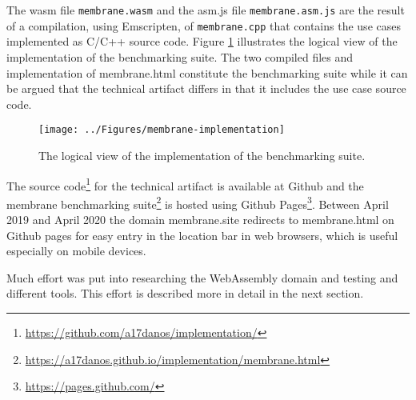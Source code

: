 \begin{comment}
\begin{figure}[!h]
\centering
\texttt{[image: ../Figures/membrane]}
\caption{The technical artifact in the form of a benchmarking suite named membrane.}
\label{membrane}
\end{figure}
\end{comment}


The wasm file \texttt{membrane.wasm} and the asm.js file \texttt{membrane.asm.js} are the result of a compilation, using Emscripten, of \texttt{membrane.cpp} that contains the use cases implemented as C/C++ source code. Figure \ref{membrane-implementation} illustrates the logical view of the implementation of the benchmarking suite. The two compiled files and implementation of membrane.html constitute the benchmarking suite while it can be argued that the technical artifact differs in that it includes the use case source code.

 
\begin{figure}[!h]
\centering
\texttt{[image: ../Figures/membrane-implementation]}
\caption{The logical view of the implementation of the benchmarking suite.}
\label{membrane-implementation}
\end{figure}
    
The source code\footnote{\url{https://github.com/a17danos/implementation/}} for the technical artifact is available at Github and the membrane benchmarking suite\footnote{\url{https://a17danos.github.io/implementation/membrane.html}} is hosted using Github Pages\footnote{\url{https://pages.github.com/}}. Between April 2019 and April 2020 the domain membrane.site redirects to membrane.html on Github pages for easy entry in the location bar in web browsers, which is useful especially on mobile devices.


Much effort was put into researching the WebAssembly domain and testing and different tools. This effort is described more in detail in the next section.

